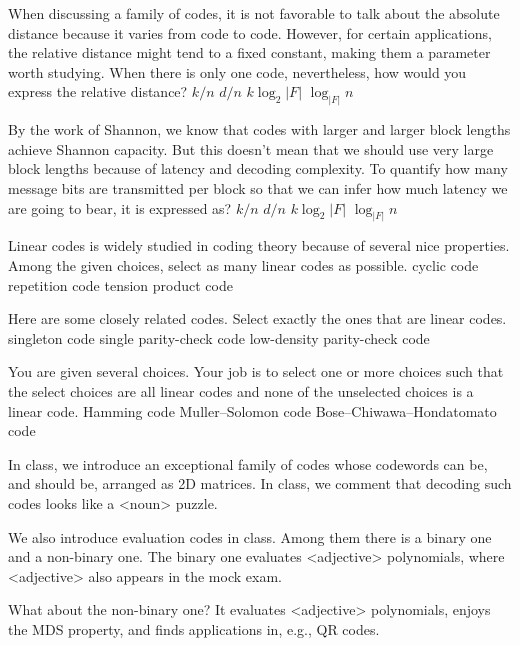 \documentclass[a4paper]{article}
\begin{document}
\Problem{2em}
When discussing a family of codes,
it is not favorable to talk about the absolute distance
because it varies from code to code.
However, for certain applications,
the relative distance might tend to a fixed constant,
making them a parameter worth studying.
When there is only one code, nevertheless,
how would you express the relative distance?
\no $k/n$
\yes $d/n$
\no $k \log_2 |F|$
\no $\log_{|F|} n$

\Problem{2em}
By the work of Shannon, we know that
codes with larger and larger block lengths
achieve Shannon capacity.
But this doesn't mean that we should use very large block lengths
because of latency and decoding complexity.
To quantify how many message bits are transmitted per block so that
we can infer how much latency we are going to bear, it is expressed as?
\no $k/n$
\no $d/n$
\yes $k \log_2 |F|$
\no $\log_{|F|} n$


\Problem{3em}
Linear codes is widely studied in coding theory
because of several nice properties.
Among the given choices, select as many linear codes as possible.
\yes cyclic code
\yes repetition code
\no tension product code

\Problem{3em}
Here are some closely related codes.
Select exactly the ones that are linear codes.
\no singleton code
\yes single parity-check code
\yes low-density parity-check code

\Problem{3em}
You are given several choices.
Your job is to select one or more choices such that the select choices
are all linear codes and none of the unselected choices is a linear code.
\yes Hamming code
\no Muller--Solomon code
\no Bose--Chiwawa--Hondatomato code

\Problem{4em}
In class, we introduce an exceptional family of codes whose codewords can be,
and should be, arranged as 2D matrices.
In class, we comment that decoding such codes looks like a <noun> puzzle.

\Problem{4em}
We also introduce evaluation codes in class.
Among them there is a binary one and a non-binary one.
The binary one evaluates <adjective> polynomials,
where <adjective> also appears in the mock exam.

\Problem{4em}
What about the non-binary one?
It evaluates <adjective> polynomials,
enjoys the MDS property,
and finds applications in, e.g., QR codes.
\end{document}
